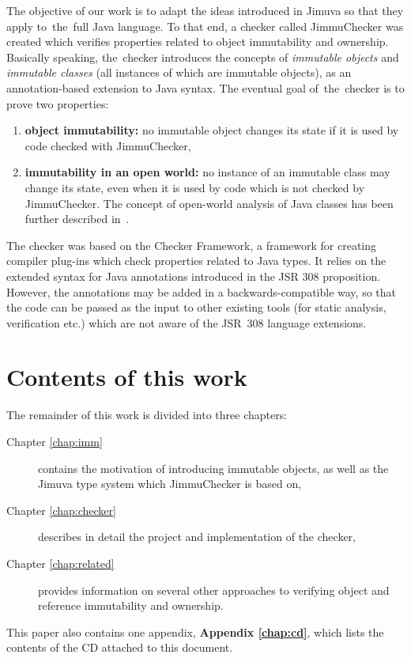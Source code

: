 \documentclass{pracamgr}
\theoremstyle{break}
\theoremstyle{break}
\theoremstyle{break}
\begin{document}
The objective of our work is to adapt the ideas introduced in Jimuva
so that they apply to~the~full Java language. To that end, a checker
called JimmuChecker was created which ve\-ri\-fies properties related
to object immutability and ownership. Basically speaking, the~checker
introduces the concepts of \emph{immutable objects} and
\emph{immutable classes} (all instances of which are immutable
objects), as an annotation-based extension to Java syntax. The eventual
goal of~the~checker is to prove two properties:
\begin{enumerate}
\item \textbf{object immutability:} no immutable object changes its
  state if it is used by code checked with JimmuChecker,
\item \textbf{immutability in an open world:} no instance of an
  immutable class may change its state, even when it is used by code
  which is not checked by JimmuChecker. The concept of open-world
  analysis of Java classes has been further described
  in~\cite{openworld}.
\end{enumerate}
The checker was based on the Checker Framework, a framework for
creating compiler plug-ins which check properties related to Java
types. It relies on the extended syntax for Java annotations
introduced in the JSR 308 proposition. However, the annotations may be
added in a backwards-compatible way, so that the code can be passed as
the input to other existing tools (for static analysis, verification
etc.) which are not aware of the JSR~308 language extensions.

\section{Contents of this work}

The remainder of this work is divided into three chapters:
\begin{description}
\item[Chapter \ref{chap:imm}] contains the motivation of introducing
  immutable objects, as well as the Jimuva type system which
  JimmuChecker is based on,
\item[Chapter \ref{chap:checker}] describes in detail the project and
  implementation of the checker,
\item[Chapter \ref{chap:related}] provides information on several
  other approaches to verifying object and reference immutability and
  ownership.
\end{description}
This paper also contains one appendix, \textbf{Appendix
  \ref{chap:cd}}, which lists the contents of the CD attached to this
document.
\end{document}
